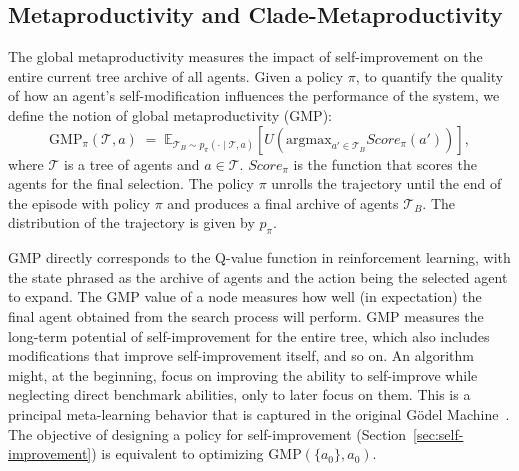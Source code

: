 \documentclass{article} %
\begin{document}
\subsection{Metaproductivity and Clade-Metaproductivity}\label{sec:CMP}

The global metaproductivity measures the impact of self-improvement on the entire current tree archive of all agents. 
Given a policy $\pi$, to quantify the quality of how an agent's self-modification influences the performance of the system, we define the notion of global metaproductivity ($\mathrm{GMP}$):
\[
\mathrm{GMP}_\pi(\mathcal{T},a) \;=\; 
\mathbb{E}_{\mathcal{T}_B \sim p_\pi(\cdot \mid \mathcal{T},a)}
\left[   U(\text{argmax}_{a' \in \mathcal{T}_B}Score_\pi(a')) \right],
\]
where $\mathcal{T}$ is a tree of agents and $a\in\mathcal{T}$. $Score_\pi$ is the function that scores the agents for the final selection. The policy $\pi$ unrolls the trajectory until the end of the episode with policy $\pi$ and produces a final archive of agents $\mathcal{T}_B$. The distribution of the trajectory is given by $p_\pi$.

$\mathrm{GMP}$ directly corresponds to the Q-value function in reinforcement learning, with the state phrased as the archive of agents and the action being the selected agent to expand. The $\mathrm{GMP}$ value of a node measures how well (in expectation) the final agent obtained from the search process will perform. $\mathrm{GMP}$ measures the long-term potential of self-improvement for the entire tree, which also includes modifications that improve self-improvement itself, and so on. 
An algorithm might, at the beginning, focus on improving the ability to self-improve while neglecting direct benchmark abilities, only to later focus on them. 
This is a principal meta-learning behavior that is captured in the original G\"odel Machine~\citep{Schmidhuber:03gm}. The objective of designing a policy for self-improvement (Section~\ref{sec:self-improvement}) is equivalent to optimizing $\mathrm{GMP}(\{a_0\}, a_0)$.
\end{document}
